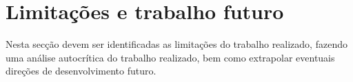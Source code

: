 \section{Limita\c{c}\~oes e trabalho futuro} %
\label{sec:limitacoes}

Nesta secção devem ser identificadas as limitações do trabalho realizado, fazendo uma análise autocrítica do trabalho realizado, bem como extrapolar eventuais direções de desenvolvimento futuro.

